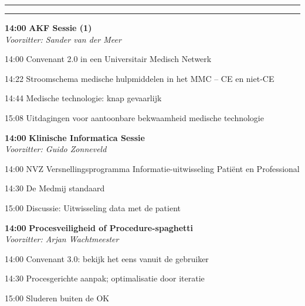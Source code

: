 \documentclass[a4paper,10pt]{report}
\begin{document}
\begin{multicols*}{3}
\vfill\strut

\columnbreak

\hrule \vspace{2mm}
\vspace{2mm}\hrule\strut

\begin{packed_enum}
\item[\textbf{14:00}] \textbf{AKF Sessie (1)}\\\textit{Voorzitter: Sander van der Meer}
\item[14:00] Convenant 2.0 in een Universitair Medisch Netwerk
\item[14:22] Stroomschema medische hulpmiddelen in het MMC -- CE en niet-CE
\item[14:44] Medische technologie: knap gevaarlijk
\item[15:08] Uitdagingen voor aantoonbare bekwaamheid medische technologie
\end{packed_enum} %

\vfill

\begin{packed_enum}
\item[\textbf{14:00}] \textbf{Klinische Informatica Sessie }\\\textit{Voorzitter: Guido Zonneveld}
\item[14:00] NVZ Versnellingsprogramma Informatie-uitwis\-seling Pa\-tiënt en Pro\-fessional 
\item[14:30] De Medmij standaard 
\item[15:00] Discussie: Uitwisseling data met de patient 
\end{packed_enum} %

\vfill

\begin{packed_enum}
\item[\textbf{14:00}] \textbf{Procesveiligheid of Procedure-spaghetti}\\\textit{Voorzitter: Arjan Wachtmeester}
\item[14:00] Convenant 3.0: bekijk het eens vanuit de gebruiker
\item[14:30] Procesgerichte aanpak; optimalisatie door iteratie
\item[15:00] Sluderen buiten de OK
\end{packed_enum} %


\end{multicols*}
\end{document}
